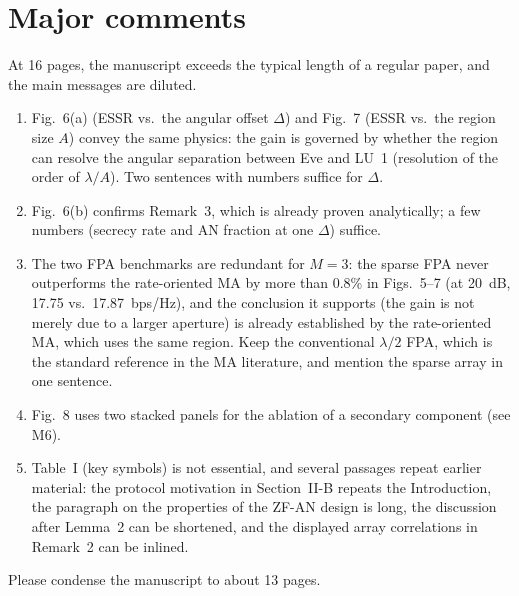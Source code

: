 \documentclass[10pt,a4paper]{article}
\begin{document}
\section{Major comments}
\begin{description}[leftmargin=0pt]
\item[M1 (Length and focus).] At 16 pages, the manuscript exceeds the typical length of a regular paper, and the main messages are diluted.
\begin{enumerate}[label=\alph*)]
\item Fig.~6(a) (ESSR vs.\ the angular offset $\Delta$) and Fig.~7 (ESSR vs.\ the region size $A$) convey the same physics: the gain is governed by whether the region can resolve the angular separation between Eve and LU~1 (resolution of the order of $\lambda/A$). Two sentences with numbers suffice for $\Delta$.
\item Fig.~6(b) confirms Remark~3, which is already proven analytically; a few numbers (secrecy rate and AN fraction at one $\Delta$) suffice.
\item The two FPA benchmarks are redundant for $M=3$: the sparse FPA never outperforms the rate-oriented MA by more than 0.8\% in Figs.~5--7 (at 20~dB, 17.75 vs.\ 17.87~bps/Hz), and the conclusion it supports (the gain is not merely due to a larger aperture) is already established by the rate-oriented MA, which uses the same region. Keep the conventional $\lambda/2$ FPA, which is the standard reference in the MA literature, and mention the sparse array in one sentence.
\item Fig.~8 uses two stacked panels for the ablation of a secondary component (see M6).
\item Table~I (key symbols) is not essential, and several passages repeat earlier material: the protocol motivation in Section~II-B repeats the Introduction, the paragraph on the properties of the ZF-AN design is long, the discussion after Lemma~2 can be shortened, and the displayed array correlations in Remark~2 can be inlined.
\end{enumerate}
Please condense the manuscript to about 13 pages.


\end{description}
\end{document}
